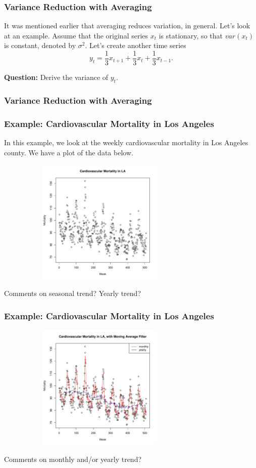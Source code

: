 \documentclass[%
xcolor=pdftex]{beamer}
\begin{document}
\begin{frame}
\frametitle{Variance Reduction with Averaging}

It was mentioned earlier that averaging reduces variation, in general. Let's look at an example. Assume that the original series $x_t$  is
stationary, so that $var(x_t)$ is constant, denoted by $\sigma^2$. Let's create another time series
$$
y_t=\frac{1}{3} x_{t+1}+\frac{1}{3} x_{t}+\frac{1}{3} x_{t-1}.
$$

\textbf{Question:} Derive the variance of $y_t$.

\end{frame}

\begin{frame}
\frametitle{Variance Reduction with Averaging}


\end{frame}

\begin{frame}
\frametitle{Example: Cardiovascular Mortality in Los Angeles}

In this example, we look at the weekly cardiovascular mortality in Los Angeles county. We have a plot of the data below.

\includegraphics[width=100mm, height=60mm]{mort.pdf}

Comments on seasonal trend? Yearly trend?

\end{frame}



\begin{frame}
\frametitle{Example: Cardiovascular Mortality in Los Angeles}

\includegraphics[width=100mm, height=60mm]{filter.pdf}

Comments on monthly and/or yearly trend?

\end{frame}
\end{document}
